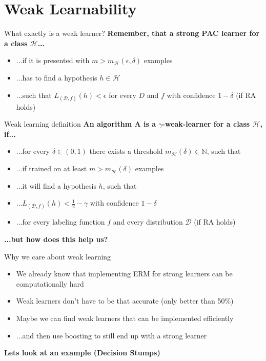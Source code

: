 \section{Weak Learnability}

\begin{frame}{What exactly is a weak learner?}
    \textbf{Remember, that a strong PAC learner for a class $\mathcal{H}$...} \pause
    \begin{itemize}
        \item ...if it is presented with $m > m_\mathcal{H}(\epsilon, \delta)$ examples \pause
        \item ...has to find a hypothesis $h \in \mathcal{H}$ \pause
        \item ...such that $L_{(\mathcal{D}, f)}(h) < \epsilon$ for every $D$ and $f$ with confidence $1 - \delta$ (if RA holds) \pause
    \end{itemize}
    \vspace{0.5cm}
    \centering
\end{frame}

\begin{frame}{Weak learning definition}
    \textbf{An algorithm A is a $\gamma$-weak-learner for a class $\mathcal{H}$, if...} \pause
    \begin{itemize}
        \item ...for every $\delta \in (0, 1)$ there exists a threshold 
            $m_{\mathcal{H}}(\delta) \in \mathbb{N}$, such that \pause
        \item ...if trained on at least $m > m_{\mathcal{H}}(\delta)$ examples \pause
        \item ...it will find a hypothesis $h$, such that \pause
        \item ...$L_{(\mathcal{D}, f)}(h) < \frac{1}{2} - \gamma$
            with confidence $1 - \delta$ \pause
        \item ...for every labeling function $f$ and every distribution $\mathcal{D}$
            (if RA holds) \pause
    \end{itemize}
    \textbf{...but how does this help us?}
\end{frame}

\begin{frame}{Why we care about weak learning}
    \begin{itemize}
        \item We already know that implementing ERM for strong learners can be
            computationally hard \pause
        \item Weak learners don't have to be that accurate (only better than 50\%) \pause
        \item Maybe we can find weak learners that can be implemented efficiently \pause
        \item ...and then use boosting to still end up with a strong learner \pause
    \end{itemize}
    \textbf{Lets look at an example (Decision Stumps)}
\end{frame}

